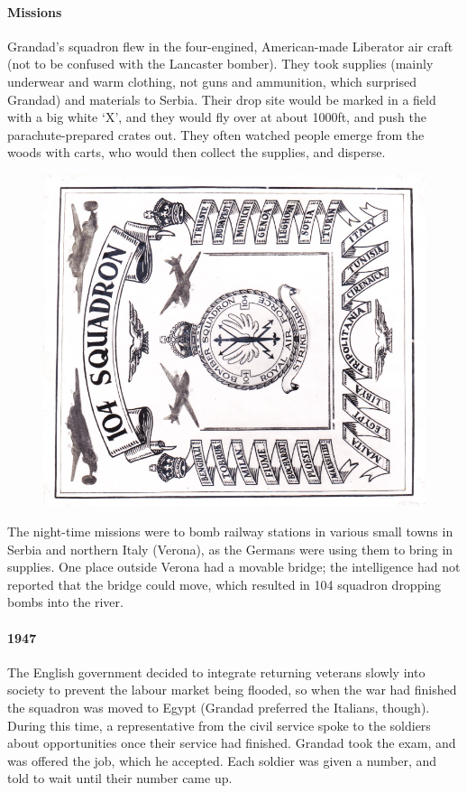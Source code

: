 \paragraph{Missions} Grandad's squadron flew in the four-engined, American-made Liberator air craft (not to be
confused with the Lancaster bomber). They
took supplies (mainly underwear and warm clothing, not guns and ammunition, which surprised Grandad)
and materials to Serbia. Their drop site would
be marked in a field with a big white `X', and they would fly over at about 1000ft, and push
the parachute-prepared crates out. They often watched people emerge from the woods with carts,
who would then collect the supplies, and disperse.

\begin{figure}
	\centering
	\includegraphics[width=.7\textwidth,trim={.15cm 0cm 0 0cm},clip]{squadron104}
\end{figure}
The night-time missions were to bomb railway stations in various small towns in Serbia and northern Italy (Verona),
as the Germans were using them to bring in supplies. One place outside Verona had a movable bridge; the
intelligence had not reported that the bridge could move, which resulted in 104 squadron dropping bombs into
the river.

\paragraph{1947} The English government
decided to integrate returning veterans slowly into society to prevent the labour market being
flooded, so when the war had finished the squadron was moved to Egypt (Grandad preferred the Italians, though).
During this time, a
representative from the civil service spoke to the soldiers about opportunities once their
service had finished. Grandad took the exam, and was offered the job, which he accepted. Each soldier was given
a number, and told to wait until their number came up.

